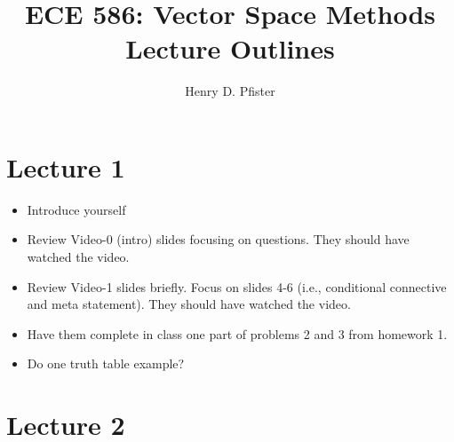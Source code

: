 \documentclass[10pt,english]{article}
\begin{document}
\title{ECE 586: Vector Space Methods \\ Lecture Outlines}
\author{Henry D. Pfister \\ \univ}
\date{}
\maketitle

\section*{Lecture 1}

\begin{itemize}
  \item Introduce yourself
  \item Review Video-0 (intro) slides focusing on questions.  They should have watched the video.
  \item Review Video-1 slides briefly.  Focus on slides 4-6 (i.e., conditional connective and meta statement).  They should have watched the video.
  \item Have them complete in class one part of problems 2 and 3 from homework 1.
  \item Do one truth table example?
\end{itemize}

\section*{Lecture 2}
\end{document}

